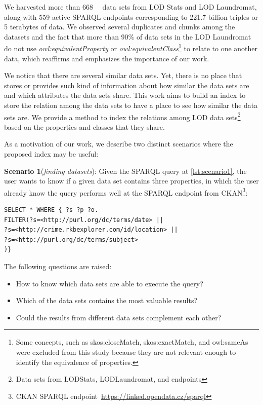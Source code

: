 \documentclass[sw]{iosart2x}
\begin{document}
We harvested more than \SI{668}{\kilo\nothing} data sets from LOD Stats and LOD Laundromat, along with 559 active SPARQL endpoints corresponding to 221.7 billion triples or 5 terabytes of data. We observed several duplicates and chunks among the datasets and the fact that more than 90\% of data sets in the LOD Laundromat do not use \textit{owl:equivalentProperty} or \textit{owl:equivalentClass}\footnote{Some concepts, such as skos:closeMatch, skos:exactMatch, and owl:sameAs were excluded from this study because they are not relevant enough to identify the equivalence of properties.} to relate to one another data, which reaffirms and emphasizes the importance of our work.

We notice that there are several similar data sets.
Yet, there is no place that stores or provides such kind of information about how similar the data sets are and which attributes the data sets share. This work aims to build an index to store the relation among the data sets to have a place to see how similar the data sets are. We provide a method to index the relations among LOD data sets\footnote{Data sets from LODStats, LODLaundromat, and endpoints} based on the properties and classes that they share.

As a motivation of our work, we describe two distinct scenarios where the proposed index may be useful:

\textbf{Scenario 1}(\textit{finding datasets}): Given the SPARQL query at \cref{lst:scenario1}, the user wants to know if a given data set contains three properties, in which the user already know the query performs well at the SPARQL endpoint from CKAN\footnote{  CKAN SPARQL endpoint~\url{https://linked.opendata.cz/sparql}}:

\begin{lstlisting}[language=SPARQL, label={lst:scenario1}, caption=Scenario 1.]
SELECT * WHERE { ?s ?p ?o.
FILTER(?s=<http://purl.org/dc/terms/date> || 
?s=<http://crime.rkbexplorer.com/id/location> || 
?s=<http://purl.org/dc/terms/subject>
)}
\end{lstlisting}

The following questions are raised:
\begin{itemize}
    \item How to know which data sets are able to execute the query?
    \item Which of the data sets contains the most valuable results?
    \item Could the results from different data sets complement each other?
\end{itemize}
\end{document}
